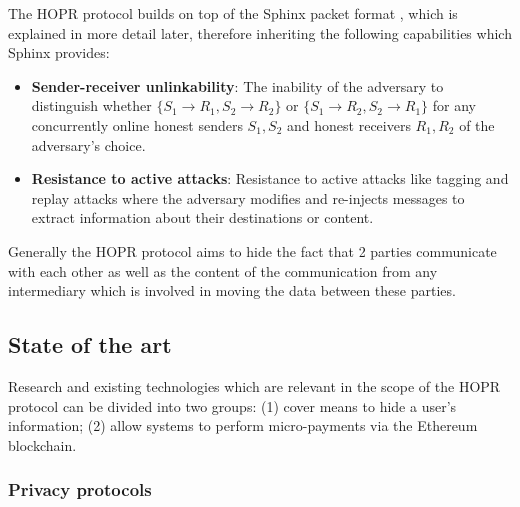 The HOPR protocol builds on top of the Sphinx packet format \cite{sphinxpaper}, which is explained
in more detail later, therefore inheriting the following capabilities which Sphinx provides:

\begin{itemize}

    \item \textbf{Sender-receiver unlinkability}: The inability of the adversary
        to distinguish whether $\{S_1\rightarrow R_1, S_2\rightarrow R_2\}$ or
        $\{S_1\rightarrow R_2, S_2\rightarrow R_1\}$ for any concurrently online
        honest senders $S_1,S_2$ and honest receivers $R_1,R_2$ of the
        adversary’s choice.

    \item \textbf{Resistance to active attacks}: Resistance to active attacks
        like tagging and replay attacks where the adversary modifies and
        re-injects messages to extract information about their destinations or
        content.

\end{itemize}
Generally the HOPR protocol aims to hide the fact that 2 parties
communicate with each other as well as the content of the communication from any
intermediary which is involved in moving the data between these parties.

\subsection{State of the art}
\label{sec:stateoftheart}

Research and existing technologies which are relevant in the scope of the HOPR
protocol can be divided into two groups: (1)  cover
means to hide a user's information; (2)  allow systems
to perform micro-payments via the Ethereum blockchain.

\subsubsection{Privacy protocols}
\label{sec:privacyprotocols}

